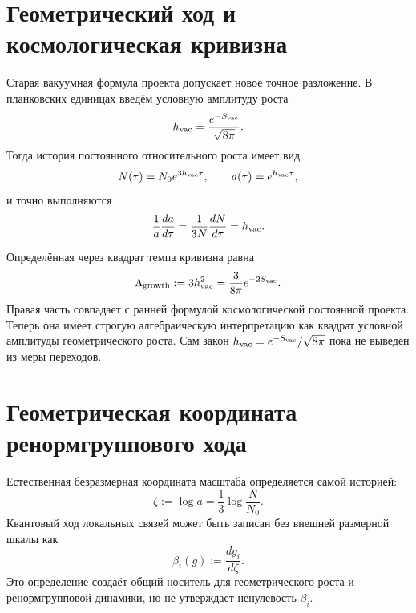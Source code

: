 \section{Геометрический ход и космологическая кривизна}

Старая вакуумная формула проекта допускает новое точное разложение. В
планковских единицах введём условную амплитуду роста
\begin{equation}
 h_{\rm vac}=\frac{e^{-S_{\rm vac}}}{\sqrt{8\pi}}.
 \label{eq:v10-vacuum-growth-amplitude}
\end{equation}
Тогда история постоянного относительного роста имеет вид
\begin{equation}
 N(\tau)=N_0e^{3h_{\rm vac}\tau},
 \qquad
 a(\tau)=e^{h_{\rm vac}\tau},
 \label{eq:v10-cell-growth-history}
\end{equation}
и точно выполняются
\begin{equation}
 \frac{1}{a}\frac{da}{d\tau}
 =\frac{1}{3N}\frac{dN}{d\tau}
 =h_{\rm vac}.
 \label{eq:v10-growth-rate-identity}
\end{equation}

Определённая через квадрат темпа кривизна равна
\begin{equation}
 \Lambda_{\rm growth}:=3h_{\rm vac}^2
 =\frac{3}{8\pi}e^{-2S_{\rm vac}}.
 \label{eq:v10-growth-cosmological-identity}
\end{equation}
Правая часть совпадает с ранней формулой космологической постоянной проекта.
Теперь она имеет строгую алгебраическую интерпретацию как квадрат условной
амплитуды геометрического роста. Сам закон
$h_{\rm vac}=e^{-S_{\rm vac}}/\sqrt{8\pi}$ пока не выведен из меры переходов.

\section{Геометрическая координата ренормгруппового хода}

Естественная безразмерная координата масштаба определяется самой историей:
\begin{equation}
 \zeta:=\log a=\frac13\log\frac{N}{N_0}.
 \label{eq:v10-geometric-rg-coordinate}
\end{equation}
Квантовый ход локальных связей может быть записан без внешней размерной
шкалы как
\begin{equation}
 \beta_i(g):=\frac{dg_i}{d\zeta}.
 \label{eq:v10-geometric-beta-definition}
\end{equation}
Это определение создаёт общий носитель для геометрического роста и
ренормгрупповой динамики, но не утверждает ненулевость $\beta_i$.

